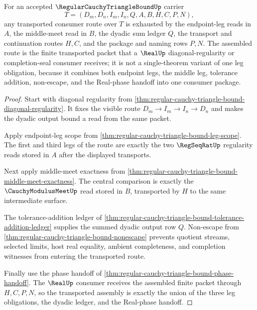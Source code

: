 \begin{theorem}
\label{thm:regular-cauchy-triangle-bound-transported-assembly}
For an accepted $\RegularCauchyTriangleBoundUp$ carrier
$$
T=(D_m,D_n,I_m,I_n,Q,A,B,H,C,P,N),
$$
any transported consumer route over $T$ is exhausted by the endpoint-leg reads in $A$, the middle-meet read in $B$, the dyadic sum ledger $Q$, the transport and continuation routes $H,C$, and the package and naming rows $P,N$. The assembled route is the finite transported packet that a $\RealUp$ diagonal-regularity or completion-seal consumer receives; it is not a single-theorem variant of one leg obligation, because it combines both endpoint legs, the middle leg, tolerance addition, non-escape, and the Real-phase handoff into one consumer package.
\end{theorem}
\begin{proof}
Start with diagonal regularity from \autoref{thm:regular-cauchy-triangle-bound-diagonal-regularity}. It fixes the visible route $D_m \longrightarrow I_m \longrightarrow I_n \longrightarrow D_n$ and makes the dyadic output bound a read from the same packet.

Apply endpoint-leg scope from \autoref{thm:regular-cauchy-triangle-bound-leg-scope}. The first and third legs of the route are exactly the two $\RegSeqRatUp$ regularity reads stored in $A$ after the displayed transports.

Next apply middle-meet exactness from \autoref{thm:regular-cauchy-triangle-bound-middle-meet-exactness}. The central comparison is exactly the $\CauchyModulusMeetUp$ read stored in $B$, transported by $H$ to the same intermediate surface.

The tolerance-addition ledger of \autoref{thm:regular-cauchy-triangle-bound-tolerance-addition-ledger} supplies the summed dyadic output row $Q$. Non-escape from \autoref{thm:regular-cauchy-triangle-bound-nonescape} prevents quotient streams, selected limits, host real equality, ambient completeness, and completion witnesses from entering the transported route.

Finally use the phase handoff of \autoref{thm:regular-cauchy-triangle-bound-phase-handoff}. The $\RealUp$ consumer receives the assembled finite packet through $H,C,P,N$, so the transported assembly is exactly the union of the three leg obligations, the dyadic ledger, and the Real-phase handoff.
\end{proof}

